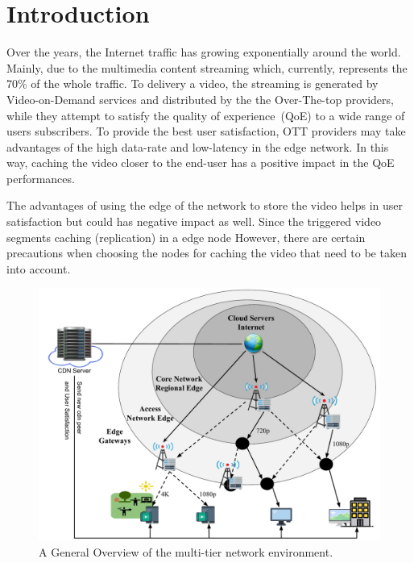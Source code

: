 \section{Introduction}
\label{sec:introduction}


Over the years, the Internet traffic has growing exponentially around the world. Mainly, due to the multimedia content streaming which, currently, represents the 70\% of the whole traffic. To delivery a video, the streaming is generated by Video-on-Demand services and distributed by the the Over-The-top providers, while they attempt to satisfy the quality of experience~(QoE) to a wide range of users subscribers. To provide the best user satisfaction, OTT providers may take advantages of the high data-rate and low-latency in the edge network. In this way, caching the video closer to the end-user has a positive impact in the QoE performances.

The advantages of using the edge of the network to store the video helps in user satisfaction but could has negative impact as well. Since the triggered video segments caching (replication) in a edge node
However, there are certain precautions when choosing the nodes for caching the video that need to be taken into account. 

\begin{figure}
    \centering
    \includegraphics[width=0.9\linewidth]{images/arch-video-content.pdf}
    \caption{A General Overview of the multi-tier network environment.}
    \label{fig:impact-two-layers}
\end{figure}

